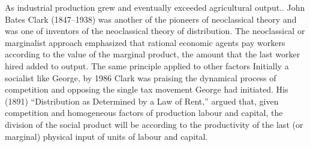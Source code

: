 As industrial production grew and eventually exceeded agricultural output..
John Bates Clark (1847--1938) was another of the pioneers of neoclassical theory and was one of inventors of the neoclassical theory of  distribution.  The neoclassical or marginalist approach emphasized that rational economic agents pay workers according to the value of the marginal product, the amount that the last worker hired added to output. %
The same principle applied to other factors  
Initially a socialist like George,   %
by 1986 Clark was praising the dynamical process of competition and opposing the single tax movement George had initiated.  His (1891) ``Distribution as Determined by a Law of Rent,''\cite{clarkDistributionDeterminedLaw1891} argued that, given  competition and homogeneous factors of production labour and capital, the division of the social product will be according to the productivity of the last (or marginal) physical input of units of labour and capital.

